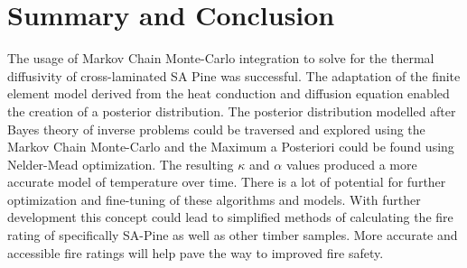 \chapter{Summary and Conclusion} \label{conclusion}

The usage of Markov Chain Monte-Carlo integration to solve for the thermal diffusivity of cross-laminated SA Pine was successful.
The adaptation of the finite element model derived from the heat conduction and diffusion equation enabled the creation of a posterior distribution.
The posterior distribution modelled after Bayes theory of inverse problems could be traversed and explored using the Markov Chain Monte-Carlo and the Maximum a Posteriori could be found using Nelder-Mead optimization.
The resulting $\kappa$ and $\alpha$ values produced a more accurate model of temperature over time.
There is a lot of potential for further optimization and fine-tuning of these algorithms and models.
With further development this concept could lead to simplified methods of calculating the fire rating of specifically SA-Pine as well as other timber samples.
More accurate and accessible fire ratings will help pave the way to improved fire safety.
